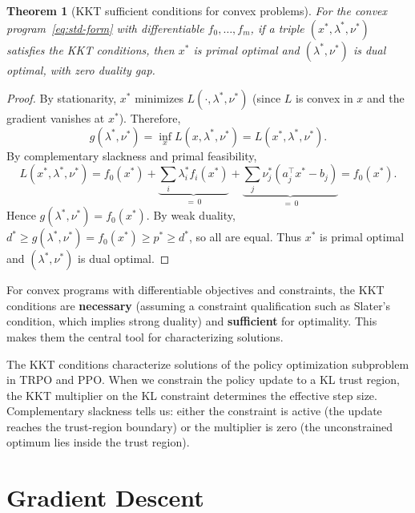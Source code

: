 \documentclass[11pt,a4paper]{article}
\theoremstyle{definition}
\theoremstyle{plain}
\newtheorem{theorem}{Theorem}[section]
\theoremstyle{remark}
\begin{document}
\begin{theorem}[KKT sufficient conditions for convex problems]\label{thm:kkt-sufficient}
For the convex program~\eqref{eq:std-form} with differentiable $f_0, \dots, f_m$,
if a triple $(x^*, \lambda^*, \nu^*)$ satisfies the KKT conditions, then $x^*$
is primal optimal and $(\lambda^*, \nu^*)$ is dual optimal, with zero duality
gap.
\end{theorem}

\begin{proof}
By stationarity, $x^*$ minimizes $L(\cdot, \lambda^*, \nu^*)$ (since
$L$ is convex in $x$ and the gradient vanishes at $x^*$). Therefore,
\[
  g(\lambda^*, \nu^*) = \inf_x L(x, \lambda^*, \nu^*) = L(x^*, \lambda^*, \nu^*).
\]
By complementary slackness and primal feasibility,
\[
  L(x^*, \lambda^*, \nu^*) = f_0(x^*) + \underbrace{\sum_i \lambda^*_i f_i(x^*)}_{=\,0}
  + \underbrace{\sum_j \nu^*_j (a_j^\top x^* - b_j)}_{=\,0} = f_0(x^*).
\]
Hence $g(\lambda^*, \nu^*) = f_0(x^*)$. By weak duality,
$d^* \ge g(\lambda^*, \nu^*) = f_0(x^*) \ge p^* \ge d^*$, so all are equal.
Thus $x^*$ is primal optimal and $(\lambda^*, \nu^*)$ is dual optimal.
\end{proof}

\begin{keyresult}[title={KKT Conditions for Convex Problems}]
For convex programs with differentiable objectives and constraints, the KKT
conditions are \textbf{necessary} (assuming a constraint qualification such as
Slater's condition, which implies strong duality) and \textbf{sufficient} for
optimality. This makes them the central tool for characterizing solutions.
\end{keyresult}

\begin{rlconnection}
The KKT conditions characterize solutions of the policy optimization
subproblem in TRPO and PPO. When we constrain the policy update to a KL
trust region, the KKT multiplier on the KL constraint determines the
effective step size. Complementary slackness tells us: either the constraint
is active (the update reaches the trust-region boundary) or the multiplier is
zero (the unconstrained optimum lies inside the trust region).
\end{rlconnection}

\section{Gradient Descent}\label{sec:gd}
\end{document}
